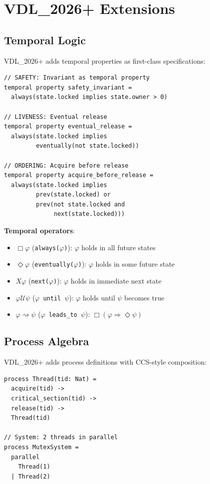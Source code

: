 \documentclass[conference]{IEEEtran}
\begin{document}
\section{VDL\_2026+ Extensions}
\label{sec:extensions}

\subsection{Temporal Logic}

VDL\_2026+ adds temporal properties as first-class specifications:

\begin{lstlisting}[caption={Temporal properties in VDL\_2026+}]
// SAFETY: Invariant as temporal property
temporal property safety_invariant =
  always(state.locked implies state.owner > 0)

// LIVENESS: Eventual release
temporal property eventual_release =
  always(state.locked implies
         eventually(not state.locked))

// ORDERING: Acquire before release
temporal property acquire_before_release =
  always(state.locked implies
         prev(state.locked) or
         prev(not state.locked and
              next(state.locked)))
\end{lstlisting}

\textbf{Temporal operators}:
\begin{itemize}
\item $\Box\varphi$ (\texttt{always($\varphi$)}): $\varphi$ holds in all future states
\item $\Diamond\varphi$ (\texttt{eventually($\varphi$)}): $\varphi$ holds in some future state
\item $X\varphi$ (\texttt{next($\varphi$)}): $\varphi$ holds in immediate next state
\item $\varphi \mathbin{\mathcal{U}} \psi$ (\texttt{$\varphi$ until $\psi$}): $\varphi$ holds until $\psi$ becomes true
\item $\varphi \rightsquigarrow \psi$ (\texttt{$\varphi$ leads\_to $\psi$}): $\Box(\varphi \Rightarrow \Diamond\psi)$
\end{itemize}

\subsection{Process Algebra}

VDL\_2026+ adds process definitions with CCS-style composition:

\begin{lstlisting}[caption={Process algebra for mutex}]
process Thread(tid: Nat) =
  acquire(tid) ->
  critical_section(tid) ->
  release(tid) ->
  Thread(tid)

// System: 2 threads in parallel
process MutexSystem =
  parallel
    Thread(1)
  | Thread(2)
\end{lstlisting}
\end{document}
